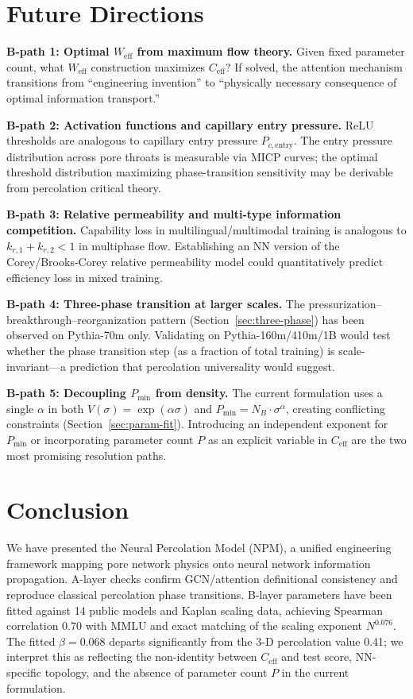 \documentclass[11pt,a4paper]{article}
\newcommand{\Weff}{W_{\text{eff}}}
\newcommand{\Ceff}{C_{\text{eff}}}
\begin{document}
\section{Future Directions}
\label{sec:future}

\textbf{B-path 1: Optimal $\Weff$ from maximum flow theory.}
Given fixed parameter count, what $\Weff$ construction maximizes $\Ceff$?
If solved, the attention mechanism transitions from ``engineering invention''
to ``physically necessary consequence of optimal information transport.''

\textbf{B-path 2: Activation functions and capillary entry pressure.}
ReLU thresholds are analogous to capillary entry pressure $P_{c,\text{entry}}$.
The entry pressure distribution across pore throats is measurable via MICP curves;
the optimal threshold distribution maximizing phase-transition sensitivity
may be derivable from percolation critical theory.

\textbf{B-path 3: Relative permeability and multi-type information competition.}
Capability loss in multilingual/multimodal training is analogous to $k_{r,1}+k_{r,2}<1$ in multiphase flow.
Establishing an NN version of the Corey/Brooks-Corey relative permeability model could quantitatively predict efficiency loss in mixed training.

\textbf{B-path 4: Three-phase transition at larger scales.}
The pressurization--breakthrough--reorganization pattern (Section~\ref{sec:three-phase})
has been observed on Pythia-70m only. Validating on Pythia-160m/410m/1B would
test whether the phase transition step (as a fraction of total training) is
scale-invariant---a prediction that percolation universality would suggest.

\textbf{B-path 5: Decoupling $P_{\min}$ from density.}
The current formulation uses a single $\alpha$ in both $V(\sigma)=\exp(\alpha\sigma)$
and $P_{\min}=N_B\cdot\sigma^\alpha$, creating conflicting constraints
(Section~\ref{sec:param-fit}). Introducing an independent exponent for $P_{\min}$
or incorporating parameter count $P$ as an explicit variable in $\Ceff$ are
the two most promising resolution paths.

\section{Conclusion}

We have presented the Neural Percolation Model (NPM), a unified engineering
framework mapping pore network physics onto neural network information
propagation. A-layer checks confirm GCN/attention definitional consistency
and reproduce classical percolation phase transitions. B-layer parameters have
been fitted against 14 public models and Kaplan scaling data, achieving
Spearman correlation 0.70 with MMLU and exact matching of the scaling exponent
$N^{0.076}$. The fitted $\beta=0.068$ departs significantly from the 3-D
percolation value 0.41; we interpret this as reflecting the non-identity
between $\Ceff$ and test score, NN-specific topology, and the absence of
parameter count $P$ in the current formulation.
\end{document}
